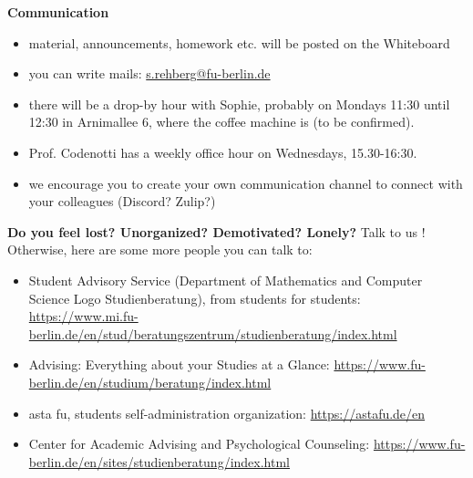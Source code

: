\documentclass[11pt]{amsart}%
\newcommand{\todo}[1]{\textcolor{red}{\textbf{TODO:} #1}}
\begin{document}
\medskip
\noindent
\textbf{Communication}
\begin{itemize}
 \item material, announcements, homework etc. will be posted on the Whiteboard
 \item you can write mails: \url{s.rehberg@fu-berlin.de}
 \item there will be  a drop-by hour with Sophie, probably on Mondays 11:30 until 12:30 in Arnimallee 6, where the coffee machine is (to be confirmed).
 \item Prof. Codenotti has a weekly office hour on Wednesdays, 15.30-16:30.
 \item we encourage you to create your own communication channel to
   connect with your colleagues (Discord? Zulip?)
\end{itemize}

\medskip
\noindent



\medskip
\noindent
\textbf{Do you feel lost? Unorganized? Demotivated? Lonely?}
 Talk to us ! Otherwise, here are some more people you can talk to:
\begin{itemize}
 \item Student Advisory Service (Department of Mathematics and Computer Science
Logo Studienberatung), from students for students: \url{https://www.mi.fu-berlin.de/en/stud/beratungszentrum/studienberatung/index.html}
 \item Advising: Everything about your Studies at a Glance: \url{https://www.fu-berlin.de/en/studium/beratung/index.html}
 \item asta fu, students self-administration organization: \url{https://astafu.de/en}
 \item Center for Academic Advising and Psychological Counseling: \url{https://www.fu-berlin.de/en/sites/studienberatung/index.html}

\end{itemize}
\end{document}
